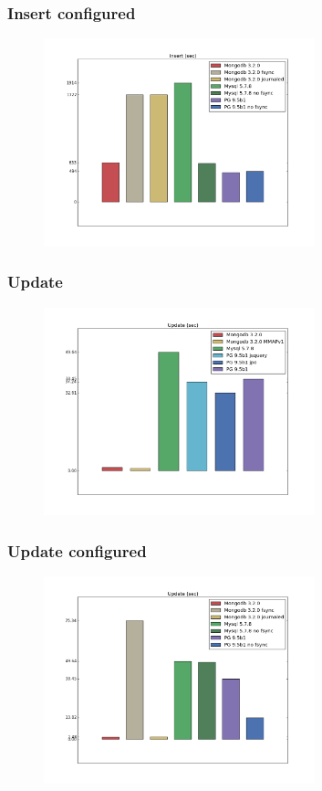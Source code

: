 \documentclass[14pt, compress, aspectratio=169]{beamer}
\begin{document}
\begin{frame}[fragile]
    \frametitle{Insert configured}
    \vspace{-35pt}
    \begin{figure}
        \includegraphics[width=0.7\textwidth,center]{insert_configured.png}
    \end{figure}
\end{frame}

\begin{frame}[fragile]
    \frametitle{Update}
    \vspace{-35pt}
    \begin{figure}
        \includegraphics[width=0.7\textwidth,center]{update.png}
    \end{figure}
\end{frame}

\begin{frame}[fragile]
    \frametitle{Update configured}
    \vspace{-35pt}
    \begin{figure}
        \includegraphics[width=0.7\textwidth,center]{update_configured.png}
    \end{figure}
\end{frame}
\end{document}
